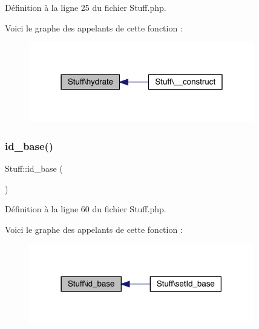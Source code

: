 Définition à la ligne 25 du fichier Stuff.\+php.

Voici le graphe des appelants de cette fonction \+:\nopagebreak
\begin{figure}[H]
\begin{center}
\leavevmode
\includegraphics[width=279pt]{class_stuff_af51c6e71896e65dd76820cd733b5f274_icgraph}
\end{center}
\end{figure}
\mbox{\label{class_stuff_a3f05761c8833bcb9f25dac07605f54e8}} 
\subsubsection{\texorpdfstring{id\+\_\+base()}{id\_base()}}
{\footnotesize\ttfamily Stuff\+::id\+\_\+base (\begin{DoxyParamCaption}{ }\end{DoxyParamCaption})}



Définition à la ligne 60 du fichier Stuff.\+php.

Voici le graphe des appelants de cette fonction \+:\nopagebreak
\begin{figure}[H]
\begin{center}
\leavevmode
\includegraphics[width=278pt]{class_stuff_a3f05761c8833bcb9f25dac07605f54e8_icgraph}
\end{center}
\end{figure}
\mbox{\label{class_stuff_afa98c482eb21f0fa990545bdb0b66dba}} 
